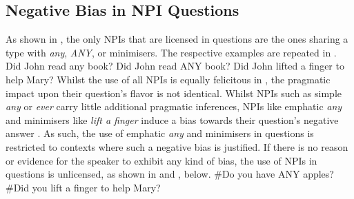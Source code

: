 \subsection{Negative Bias in NPI Questions}
As shown in , the only NPIs that are licensed in questions are the ones sharing a type with \textit{any}, \textit{ANY}, or minimisers. The respective examples are repeated in .
\pex\label{ex:npi-question-repeat}
\a Did John read any book?
\a Did John read \MakeUppercase{any} book?
\a Did John lifted a finger to help Mary?
\xe
Whilst the use of all NPIs is equally felicitous in , the pragmatic impact upon their question's flavor is not identical. Whilst NPIs such as simple \textit{any} or \textit{ever} carry little additional pragmatic inferences, NPIs like emphatic \textit{any} and minimisers like \textit{lift a finger} induce a bias towards their question's negative answer  \parencite{Borkin1971,Heim1984,Krifka1995,Abels2003,vanRooij2003,Guerzoni2003,Guerzoni2004,Asher2005,Nicolae2013,Nicolae2015,Jeong2020,Jeong2021,Jeong2022}. As such, the use of emphatic \textit{any} and minimisers in questions is restricted to contexts where such a negative bias is justified. If there is no reason or evidence for the speaker to exhibit any kind of bias, the use of NPIs in questions is unlicensed, as shown in  and , below.
\ex
{}
\#Do you have ANY apples?\hfill\parencite[p.~41]{Jeong2022}
\xe
\ex
{}
\#Did you lift a finger to help Mary?
\xe

